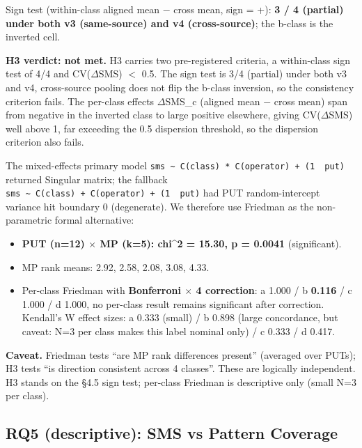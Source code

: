 \documentclass[manuscript,screen,review]{acmart}
\begin{document}
Sign test (within-class aligned mean $-$ cross mean, sign = +): \textbf{3
/ 4 (partial) under both v3 (same-source) and v4 (cross-source)}; the
b-class is the inverted cell.

\textbf{H3 verdict: not met.} H3 carries two pre-registered criteria, a
within-class sign test of 4/4 and CV($\Delta$SMS) $<$ 0.5. The sign test
is 3/4 (partial) under both v3 and v4, cross-source pooling does not
flip the b-class inversion, so the consistency criterion fails. The
per-class effects $\Delta$SMS\_c (aligned mean $-$ cross mean) span from
negative in the inverted class to large positive elsewhere, giving
CV($\Delta$SMS) well above 1, far exceeding the 0.5 dispersion threshold,
so the dispersion criterion also fails.

The mixed-effects primary model
\texttt{sms\ \textasciitilde{}\ C(class)\ *\ C(operator)\ +\ (1\ \textbar{}\ put)}
returned Singular matrix; the fallback
\texttt{sms\ \textasciitilde{}\ C(class)\ +\ C(operator)\ +\ (1\ \textbar{}\ put)}
had PUT random-intercept variance hit boundary 0 (degenerate). We
therefore use Friedman as the non-parametric formal alternative:

\begin{itemize}

\item
  \textbf{PUT (n=12) $\times$ MP (k=5): chi\^{}2 = 15.30, p = 0.0041}
  (significant).
\item
  MP rank means: 2.92, 2.58, 2.08, 3.08, 4.33.
\item
  Per-class Friedman with \textbf{Bonferroni $\times$ 4 correction}: a
  1.000 / b \textbf{0.116} / c 1.000 / d 1.000, no per-class
  result remains significant after correction. Kendall's W effect sizes:
  a 0.333 (small) / b 0.898 (large concordance, but caveat: N=3 per
  class makes this label nominal only) / c 0.333 / d 0.417.
\end{itemize}

\textbf{Caveat.} Friedman tests ``are MP rank differences present''
(averaged over PUTs); H3 tests ``is direction consistent across 4
classes''. These are logically independent. H3 stands on the §4.5 sign
test; per-class Friedman is descriptive only (small N=3 per class).

\subsection{RQ5 (descriptive): SMS vs Pattern Coverage}\label{rq4-sms-vs-pattern-coverage}
\end{document}
